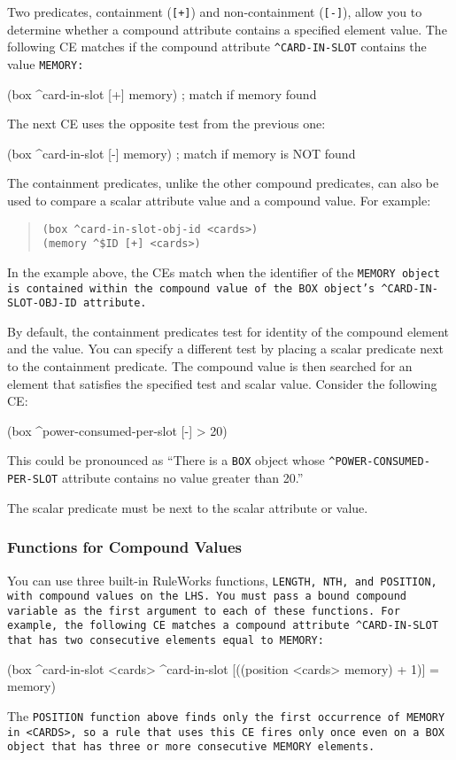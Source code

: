 Two predicates, containment (\verb|[+]|) and non-containment
(\verb|[-]|), allow you to determine whether a compound attribute
contains a specified element value. The following CE matches if the
compound attribute \verb|^CARD-IN-SLOT| contains the value
\tt{MEMORY}:
\begin{qv}
(box ^card-in-slot [+] memory) ; match if memory found
\end{qv}

The next CE uses the opposite test from the previous one:

\begin{qv}
(box ^card-in-slot [-] memory) ; match if memory is  NOT found
\end{qv}
   
The containment predicates, unlike the other compound predicates, can
also be used to compare a scalar attribute value and a compound
value. For example:
\begin{quote}
\begin{verbatim}
(box ^card-in-slot-obj-id <cards>)
(memory ^$ID [+] <cards>)
\end{verbatim}
\end{quote}
In the example above, the CEs match when the identifier of the
\tt{MEMORY} object is contained within the compound value of the
\tt{BOX} object's \verb|^CARD-IN-SLOT-OBJ-ID| attribute.

By default, the containment predicates test for identity of the
compound element and the value. You can specify a different test by
placing a scalar predicate next to the containment predicate. The
compound value is then searched for an element that satisfies the
specified test and scalar value. Consider the following CE:
\begin{qv}
(box ^power-consumed-per-slot [-] > 20)
\end{qv}

This could be pronounced as ``There is a \verb|BOX| object whose
\verb|^POWER-CONSUMED-PER-SLOT| attribute contains no value greater
than 20.''

The scalar predicate must be next to the scalar attribute or value.

\subsubsection*{Functions for Compound Values}

You can use three built-in RuleWorks functions, \tt{LENGTH}, \tt{NTH},
and \tt{POSITION}, with compound values on the LHS. You must pass a
bound compound variable as the first argument to each of these
functions. For example, the following CE matches a compound attribute
\verb|^CARD-IN-SLOT| that has two consecutive elements equal to
\tt{MEMORY}:
\begin{qv}
(box ^card-in-slot <cards>
     ^card-in-slot [((position <cards> memory) + 1)] = memory)
\end{qv}   
The \tt{POSITION} function above finds only the first occurrence of
\tt{MEMORY} in \verb|<CARDS>|, so a rule that uses this CE fires only
once even on a \tt{BOX} object that has three or more consecutive
\tt{MEMORY} elements.

